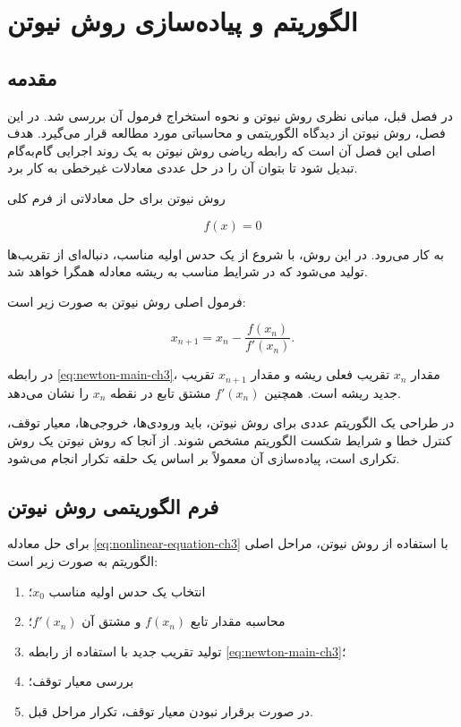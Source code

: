 \chapter{الگوریتم و پیاده‌سازی روش نیوتن}\label{ch:algorithm}
\label{chap:newton-algorithm}

\section{مقدمه}

در فصل قبل، مبانی نظری روش نیوتن و نحوه استخراج فرمول آن بررسی شد. در این فصل، روش نیوتن از دیدگاه الگوریتمی و محاسباتی مورد مطالعه قرار می‌گیرد. هدف اصلی این فصل آن است که رابطه ریاضی روش نیوتن به یک روند اجرایی گام‌به‌گام تبدیل شود تا بتوان آن را در حل عددی معادلات غیرخطی به کار برد.

روش نیوتن برای حل معادلاتی از فرم کلی

\begin{equation}
f(x)=0
\label{eq:nonlinear-equation-ch3}
\end{equation}

به کار می‌رود. در این روش، با شروع از یک حدس اولیه مناسب، دنباله‌ای از تقریب‌ها تولید می‌شود که در شرایط مناسب به ریشه معادله همگرا خواهد شد.

فرمول اصلی روش نیوتن به صورت زیر است:

\begin{equation}
x_{n+1}=x_n-\frac{f(x_n)}{f'(x_n)}.
\label{eq:newton-main-ch3}
\end{equation}

در رابطه \eqref{eq:newton-main-ch3}، مقدار \(x_n\) تقریب فعلی ریشه و مقدار \(x_{n+1}\) تقریب جدید ریشه است. همچنین \(f'(x_n)\) مشتق تابع در نقطه \(x_n\) را نشان می‌دهد.

در طراحی یک الگوریتم عددی برای روش نیوتن، باید ورودی‌ها، خروجی‌ها، معیار توقف، کنترل خطا و شرایط شکست الگوریتم مشخص شوند. از آنجا که روش نیوتن یک روش تکراری است، پیاده‌سازی آن معمولاً بر اساس یک حلقه تکرار انجام می‌شود.

\section{فرم الگوریتمی روش نیوتن}

برای حل معادله \eqref{eq:nonlinear-equation-ch3} با استفاده از روش نیوتن، مراحل اصلی الگوریتم به صورت زیر است:

\begin{enumerate}
    \item انتخاب یک حدس اولیه مناسب \(x_0\)؛
    \item محاسبه مقدار تابع \(f(x_n)\) و مشتق آن \(f'(x_n)\)؛
    \item تولید تقریب جدید با استفاده از رابطه \eqref{eq:newton-main-ch3}؛
    \item بررسی معیار توقف؛
    \item در صورت برقرار نبودن معیار توقف، تکرار مراحل قبل.
\end{enumerate}

